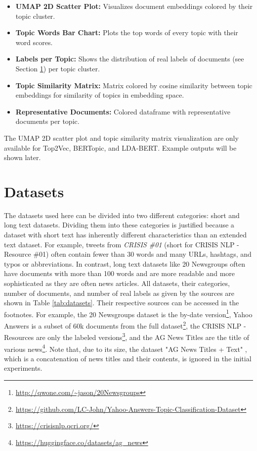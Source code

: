 \documentclass[11pt]{article}
\begin{document}
\begin{itemize}
\item \textbf{UMAP 2D Scatter Plot:} Visualizes document embeddings colored by their topic cluster.
\item \textbf{Topic Words Bar Chart:} Plots the top words of every topic with their word scores.
\item \textbf{Labels per Topic:} Shows the distribution of real labels of documents (see Section \ref{sec:datasets}) per topic cluster.
\item \textbf{Topic Similarity Matrix:} Matrix colored by cosine similarity between topic embeddings for similarity of topics in embedding space.
\item \textbf{Representative Documents:} Colored dataframe with representative documents per topic. 
\end{itemize}

The UMAP 2D scatter plot and topic similarity matrix visualization are only available for Top2Vec, BERTopic, and LDA-BERT. Example outputs will be shown later.

\section{Datasets}
\label{sec:datasets}
 
The datasets used here can be divided into two different categories: short and long text datasets. Dividing them into these categories is justified because a dataset with short text has inherently different characteristics than an extended text dataset. For example, tweets from \emph{CRISIS \#01} (short for CRISIS NLP - Resource \#01) often contain fewer than 30 words and many URLs, hashtags, and typos or abbreviations. In contrast, long text datasets like 20 Newsgroups often have documents with more than 100 words and are more readable and more sophisticated as they are often news articles. All datasets, their categories, number of documents, and number of real labels as given by the sources are shown in Table \ref{tab:datasets}. Their respective sources can be accessed in the footnotes. For example, the 20 Newsgroups dataset is the by-date version\footnote{\url{http://qwone.com/~jason/20Newsgroups}}, Yahoo Answers is a subset of 60k documents from the full dataset\footnote{\url{https://github.com/LC-John/Yahoo-Answers-Topic-Classification-Dataset}}, the CRISIS NLP - Resources are only the labeled versions\footnote{\label{foot:crisis}\url{https://crisisnlp.qcri.org/}}, and the AG News Titles are the title of various news\footnote{\url{https://huggingface.co/datasets/ag_news}}. Note that, due to its size, the dataset "AG News Titles + Text" , which is a concatenation of news titles and their contents, is ignored in the initial experiments.
\end{document}
